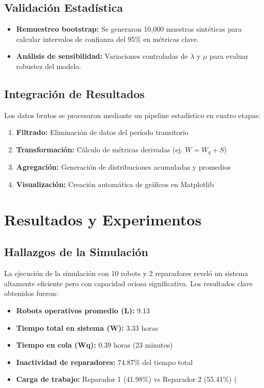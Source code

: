 \documentclass[12pt, a4paper]{article}
\begin{document}
\subsection{Validación Estadística}
\begin{itemize}
    \item \textbf{Remuestreo bootstrap:} Se generaron 10,000 muestras sintéticas para calcular intervalos de confianza del 95\% en métricas clave.
    
    \item \textbf{Análisis de sensibilidad:} Variaciones controladas de $\lambda$ y $\mu$ para evaluar robustez del modelo.
    
\end{itemize}


\subsection{Integración de Resultados}
Los datos brutos se procesaron mediante un pipeline estadístico en cuatro etapas:
\begin{enumerate}
    \item \textbf{Filtrado:} Eliminación de datos del período transitorio
    \item \textbf{Transformación:} Cálculo de métricas derivadas (ej. $W = W_q + S$)
    \item \textbf{Agregación:} Generación de distribuciones acumuladas y promedios
    \item \textbf{Visualización:} Creación automática de gráficos en Matplotlib
\end{enumerate}

\section{Resultados y Experimentos}
\label{sec:resultados}

\subsection{Hallazgos de la Simulación}
La ejecución de la simulación con 10 robots y 2 reparadores reveló un sistema altamente eficiente pero con capacidad ociosa significativa. Los resultados clave obtenidos fueron:
\begin{itemize}
    \item \textbf{Robots operativos promedio (L):} 9.13
    \item \textbf{Tiempo total en sistema (W):} 3.33 horas
    \item \textbf{Tiempo en cola (Wq):} 0.39 horas (23 minutos)
    \item \textbf{Inactividad de reparadores:} 74.87\% del tiempo total
    \item \textbf{Carga de trabajo:} Reparador 1 (41.98\%) vs Reparador 2 (55.41\%) (%
\end{itemize}
\end{document}
